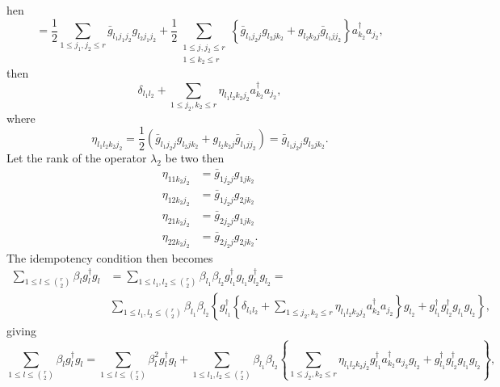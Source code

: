 \documentclass[aps,preprint]{revtex4}%
\begin{document}
hen%
\begin{equation}
=\frac{1}{2}\sum_{1\leq j_{1},j_{2}\leq r}\bar{g}_{l_{1}j_{1}j_{2}}%
g_{l_{2}j_{1}j_{2}}+\frac{1}{2}\sum_{\substack{1\leq j,j_{2}\leq r\\1\leq
k_{2}\leq r}}\left\{  \bar{g}_{l_{1}j_{2}j}g_{l_{2}jk_{2}}+g_{l_{2}k_{2}j}%
\bar{g}_{l_{1}jj_{2}}\right\}  a_{k_{2}}^{\dagger}a_{j_{2}},
\end{equation}
then%
\begin{equation}
\delta_{l_{1}l_{2}}+\sum_{1\leq j_{2},k_{2}\leq r}\eta_{l_{1}l_{2}k_{2}j_{2}%
}a_{k_{2}}^{\dagger}a_{j_{2}},
\end{equation}
where
\begin{equation}
\eta_{l_{1}l_{2}k_{2}j_{2}}=\frac{1}{2}\left(  \bar{g}_{l_{1}j_{2}j}%
g_{l_{2}jk_{2}}+g_{l_{2}k_{2}j}\bar{g}_{l_{1}jj_{2}}\right)  =\bar{g}%
_{l_{1}j_{2}j}g_{l_{2}jk_{2}}.
\end{equation}
Let the rank of the operator $\lambda_{2}$ be two then
\begin{align}
\eta_{11k_{2}j_{2}}  &  =\bar{g}_{1j_{2}j}g_{1jk_{2}}\\
\eta_{12k_{2}j_{2}}  &  =\bar{g}_{1j_{2}j}g_{2jk_{2}}\\
\eta_{21k_{2}j_{2}}  &  =\bar{g}_{2j_{2}j}g_{1jk_{2}}\\
\eta_{22k_{2}j_{2}}  &  =\bar{g}_{2j_{2}j}g_{2jk_{2}}.
\end{align}
The idempotency condition then becomes%
\begin{align}
\sum_{1\leq l\leq\binom{r}{2}}\beta_{l}g_{l}^{\dagger}g_{l}  &  =\sum_{1\leq
l_{1},l_{2}\leq\binom{r}{2}}\beta_{l_{1}}\beta_{l_{2}}g_{l_{1}}^{\dagger
}g_{l_{1}}g_{l_{2}}^{\dagger}g_{l_{2}}=\nonumber\\
&  \sum_{1\leq l_{1},l_{2}\leq\binom{r}{2}}\beta_{l_{1}}\beta_{l_{2}}\left\{
g_{l_{1}}^{\dagger}\left\{  \delta_{l_{1}l_{2}}+\sum_{1\leq j_{2},k_{2}\leq
r}\eta_{l_{1}l_{2}k_{2}j_{2}}a_{k_{2}}^{\dagger}a_{j_{2}}\right\}  g_{l_{2}%
}+g_{l_{1}}^{\dagger}g_{l_{2}}^{\dagger}g_{l_{1}}g_{l_{2}}\right\}  ,
\end{align}
giving%
\begin{equation}
\sum_{1\leq l\leq\binom{r}{2}}\beta_{l}g_{l}^{\dagger}g_{l}=\sum_{1\leq
l\leq\binom{r}{2}}\beta_{l}^{2}g_{l}^{\dagger}g_{l}+\sum_{1\leq l_{1}%
,l_{2}\leq\binom{r}{2}}\beta_{l_{1}}\beta_{l_{2}}\left\{  \sum_{1\leq
j_{2},k_{2}\leq r}\eta_{l_{1}l_{2}k_{2}j_{2}}g_{l_{1}}^{\dagger}a_{k_{2}%
}^{\dagger}a_{j_{2}}g_{l_{2}}+g_{l_{1}}^{\dagger}g_{l_{2}}^{\dagger}g_{l_{1}%
}g_{l_{2}}\right\}  ,
\end{equation}
\end{document}
